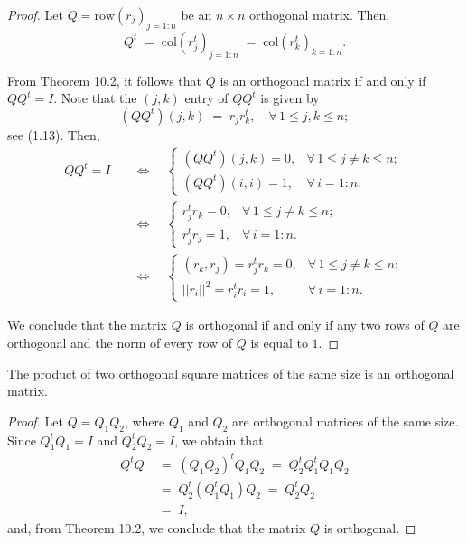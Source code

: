 \begin{proof}
Let $Q = \mathrm{row}(r_j)_{j=1:n}$ be an $n \times n$ orthogonal matrix. Then,
\[
Q^t \;=\; \mathrm{col}\left(r_j^t\right)_{j=1:n} \;=\; \mathrm{col}\left(r_k^t\right)_{k=1:n}.
\]

From Theorem 10.2, it follows that $Q$ is an orthogonal matrix if and only if
$QQ^t = I$. Note that the $(j,k)$ entry of $QQ^t$ is given by
\[
(QQ^t)(j,k) \;=\; r_jr_k^t, \quad \forall\, 1 \le j,k \le n;
\]
see (1.13). Then,
\begin{align*}
QQ^t = I \quad &\iff \quad
\begin{cases}
(QQ^t)(j,k) = 0, & \forall\, 1 \le j \ne k \le n; \\
(QQ^t)(i,i) = 1, & \forall\, i = 1:n.
\end{cases} \\
&\iff \quad
\begin{cases}
r_j^tr_k = 0, & \forall\, 1 \le j \ne k \le n; \\
r_j^tr_j = 1, & \forall\, i = 1:n.
\end{cases} \\
&\iff \quad
\begin{cases}
(r_k,r_j) = r_j^tr_k = 0, & \forall\, 1 \le j \ne k \le n; \\
||r_i||^2 = r_i^tr_i = 1, & \forall\, i = 1:n.
\end{cases}
\end{align*}

We conclude that the matrix $Q$ is orthogonal if and only if any two rows of $Q$ are
orthogonal and the norm of every row of $Q$ is equal to $1$.
\end{proof}

\begin{lemma}
The product of two orthogonal square matrices of the same size is an orthogonal
matrix.
\end{lemma}

\begin{proof}
Let $Q = Q_1Q_2$, where $Q_1$ and $Q_2$ are orthogonal matrices of the same size.
Since $Q_1^tQ_1 = I$ and $Q_2^tQ_2 = I$, we obtain that
\begin{align*}
Q^tQ \;&=\; (Q_1Q_2)^tQ_1Q_2 \;=\; Q_2^tQ_1^tQ_1Q_2 \\
&=\; Q_2^t(Q_1^tQ_1)Q_2 \;=\; Q_2^tQ_2 \\
&=\; I,
\end{align*}
and, from Theorem 10.2, we conclude that the matrix $Q$ is orthogonal.
\end{proof}
